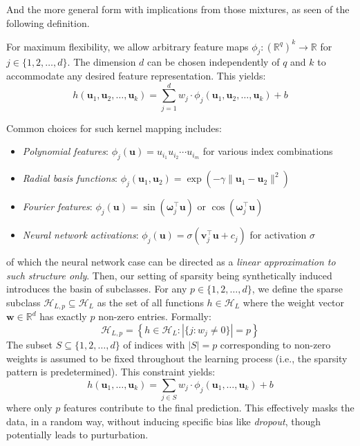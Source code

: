\documentclass[10pt]{article} %
\begin{document}
And the more general form with implications from those mixtures, as seen of the following definition. 

\begin{definition}
    For maximum flexibility, we allow arbitrary feature maps $\phi_j: (\mathbb{R}^{q})^k \to \mathbb{R}$ for $j \in \{1, 2, \ldots, d\}$. The dimension $d$ can be chosen independently of $q$ and $k$ to accommodate any desired feature representation. This yields:
        \begin{equation}
            h(\mathbf{u}_1, \mathbf{u}_2, \ldots, \mathbf{u}_k) = \sum_{j=1}^{d} w_j \cdot \phi_j(\mathbf{u}_1, \mathbf{u}_2, \ldots, \mathbf{u}_k) + b
        \end{equation}
\end{definition}
Common choices for such kernel mapping includes:
        \begin{itemize}
            \item \textit{Polynomial features}: $\phi_j(\mathbf{u}) = u_{i_1} u_{i_2} \cdots u_{i_m}$ for various index combinations
            \item \textit{Radial basis functions}: $\phi_j(\mathbf{u}_1, \mathbf{u}_2) = \exp(-\gamma \|\mathbf{u}_1 - \mathbf{u}_2\|^2)$
            \item \textit{Fourier features}: $\phi_j(\mathbf{u}) = \sin(\boldsymbol{\omega}_j^{\top}\mathbf{u})$ or $\cos(\boldsymbol{\omega}_j^{\top}\mathbf{u})$
            \item \textit{Neural network activations}: $\phi_j(\mathbf{u}) = \sigma(\mathbf{v}_j^{\top}\mathbf{u} + c_j)$ for activation $\sigma$
\end{itemize}
of which the neural network case can be directed as a \textit{linear approximation to such structure only}. Then, our setting of sparsity being synthetically induced introduces the basin of subclasses. For any $p \in \{1, 2, \ldots, d\}$, we define the sparse subclass $\mathcal{H}_{L,p} \subseteq \mathcal{H}_{L}$ as the set of all functions $h \in \mathcal{H}_{L}$ where the weight vector $\mathbf{w} \in \mathbb{R}^{d}$ has exactly $p$ non-zero entries. Formally:
\begin{equation}
        \mathcal{H}_{L,p} = \left\{ h \in \mathcal{H}_{L} : |\{j : w_j \neq 0\}| = p \right\}
    \end{equation}
    The subset $S \subseteq \{1, 2, \ldots, d\}$ of indices with $|S| = p$ corresponding to non-zero weights is assumed to be fixed throughout the learning process (i.e., the sparsity pattern is predetermined). This constraint yields:
    \begin{equation}
        h(\mathbf{u}_1, \ldots, \mathbf{u}_k) = \sum_{j \in S} w_j \cdot \phi_j(\mathbf{u}_1, \ldots, \mathbf{u}_k) + b
    \end{equation}
    where only $p$ features contribute to the final prediction. This effectively masks the data, in a random way, without inducing specific bias like \textit{dropout}, though potentially leads to purturbation. 
\end{document}
